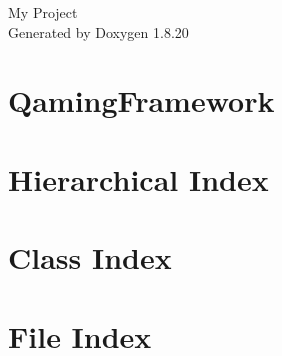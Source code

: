 \let\mypdfximage\pdfximage\def\pdfximage{\immediate\mypdfximage}\documentclass[twoside]{book}
\newcommand{\+}{\discretionary{\mbox{\scriptsize$\hookleftarrow$}}{}{}}
\newcommand{\clearemptydoublepage}{%
  \newpage{\pagestyle{empty}\cleardoublepage}%
}
\begin{document}
\hypersetup{pageanchor=false,
             bookmarksnumbered=true,
             pdfencoding=unicode
            }
\begin{titlepage}
\vspace*{7cm}
\begin{center}%
{\Large My Project }\\
\vspace*{1cm}
{\large Generated by Doxygen 1.8.20}\\
\end{center}
\end{titlepage}
\clearemptydoublepage
{}
\tableofcontents
\clearemptydoublepage
{}
\hypersetup{pageanchor=true}

\chapter{Qaming\+Framework}
\label{md__home_malek_projects_C-Cpp_Qt_repos_qamingframework_QamingFramework_README}

\chapter{Hierarchical Index}

\chapter{Class Index}

\chapter{File Index}

\end{document}
